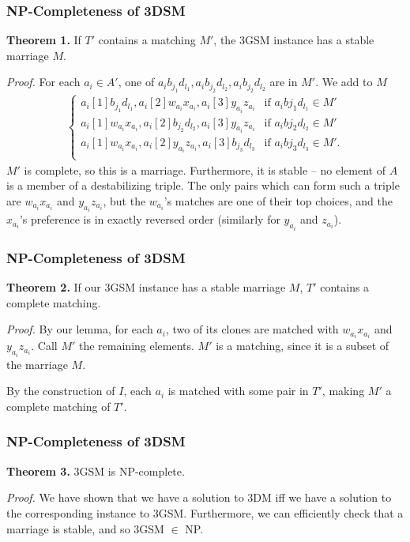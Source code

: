 \documentclass[mathserif,serif]{beamer}
\begin{document}
\begin{frame}
  \frametitle{NP-Completeness of 3DSM}
  \textbf{Theorem 1.} If $T'$ contains a matching $M'$, the 3GSM instance has a stable marriage $M$.

  \textit{Proof.} For each $a_i \in A'$, one of $a_ib_{j_1}d_{l_1}, a_ib_{j_2}d_{l_2}, a_ib_{j_2}d_{l_2}$ are in $M'$. We add to $M$
  \begin{align*}
    \begin{cases}
      a_i[1]b_{j_1}d_{l_1}, a_i[2]w_{a_i}x_{a_i}, a_i[3]y_{a_i}z_{a_i} & \text{if } a_ib{j_1}d_{l_1} \in M' \\
      a_i[1]w_{a_i}x_{a_i}, a_i[2]b_{j_2}d_{l_2}, a_i[3]y_{a_i}z_{a_i} & \text{if } a_ib{j_2}d_{l_2} \in M' \\
      a_i[1]w_{a_i}x_{a_i}, a_i[2]y_{a_i}z_{a_i}, a_i[3]b_{j_3}d_{l_3} & \text{if } a_ib{j_3}d_{l_3} \in M'. \\
    \end{cases}
  \end{align*}
  $M'$ is complete, so this is a marriage. Furthermore, it is stable -- no element of $A$ is a member of a destabilizing triple. The only pairs which can form such a triple are $w_{a_i}x_{a_i}$ and $y_{a_i}z_{a_i}$, but the $w_{a_i}$'s matches are one of their top choices, and the $x_{a_i}$'s preference is in exactly reversed order (similarly for $y_{a_i}$ and $z_{a_i}$).
\end{frame}

\begin{frame}
  \frametitle{NP-Completeness of 3DSM}
  \textbf{Theorem 2.} If our 3GSM instance has a stable marriage $M$, $T'$ contains a complete matching.

  \textit{Proof.} By our lemma, for each $a_i$, two of its clones are matched with $w_{a_i}x_{a_i}$ and $y_{a_i}z_{a_i}$. Call $M'$ the remaining elements. $M'$ is a matching, since it is a subset of the marriage $M$.

  By the construction of $I$, each $a_i$ is matched with some pair in $T'$, making $M'$ a complete matching of $T'$.
\end{frame}

\begin{frame}
  \frametitle{NP-Completeness of 3DSM}
  \textbf{Theorem 3.} 3GSM is NP-complete.

  \textit{Proof.} We have shown that we have a solution to 3DM iff we have a solution to the corresponding instance to 3GSM. Furthermore, we can efficiently check that a marriage is stable, and so 3GSM $\in$ NP.
\end{frame}
\end{document}

